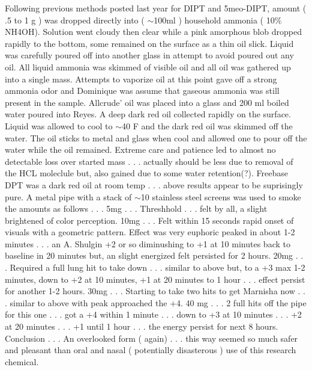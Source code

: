 \documentclass[12pt]{book}
\begin{document}
Following previous methods posted last year for DIPT and 5meo-DIPT, amount ( .5 to 1 g ) was dropped directly into ( $\sim$100ml ) household ammonia ( 10\% NH4OH). Solution went cloudy then clear while a pink amorphous blob dropped rapidly to the bottom, some remained on the surface as a thin oil slick. Liquid was carefully poured off into another glass in attempt to avoid poured out any oil. All liquid ammonia was skimmed of visible oil and all oil was gathered up into a single mass. Attempts to vaporize oil at this point gave off a strong ammonia odor and Dominique was assume that gaseous ammonia was still present in the sample. Allcrude' oil was placed into a glass and 200 ml boiled water poured into Reyes. A deep dark red oil collected rapidly on the surface. Liquid was allowed to cool to $\sim$40 F and the dark red oil was skimmed off the water. The oil sticks to metal and glass when cool and allowed one to pour off the water while the oil remained. Extreme care and patience led to almost no detectable loss over started mass . . .  actually should be less due to removal of the HCL moleclule but, also gained due to some water retention(?). Freebase DPT was a dark red oil at room temp . . .  above results appear to be suprisingly pure. A metal pipe with a stack of $\sim$10 stainless steel screens was used to smoke the amounts as follows . . .  5mg . . .  Threshhold . . .  felt by all, a slight brightened of color perception. 10mg . . .  Felt within 15 seconds rapid onset of visuals with a geometric pattern. Effect was very euphoric peaked in about 1-2 minutes . . .  an A. Shulgin +2 or so diminushing to +1 at 10 minutes back to baseline in 20 minutes but, an slight energized felt persisted for 2 hours. 20mg . . .  Required a full lung hit to take down . . .  similar to above but, to a +3 max 1-2 minutes, down to +2 at 10 minutes, +1 at 20 minutes to 1 hour . . .  effect persist for another 1-2 hours. 30mg . . .  Starting to take two hits to get Marnisha now . . .  similar to above with peak approached the +4. 40 mg  . . .  2 full hits off the pipe for this one . . .  got a +4 within 1 minute . . .  down to +3 at 10 minutes . . .  +2 at 20 minutes . . .  +1 until 1 hour . . .  the energy persist for next 8 hours. Conclusion . . .  An overlooked form ( again) . . .  this way seemed so much safer and pleasant than oral and nasal ( potentially disasterous ) use of this research chemical.
\end{document}
